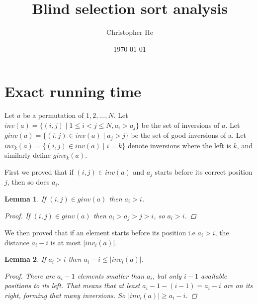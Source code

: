 \documentclass{article}
\title{Blind selection sort analysis}
\author{Christopher He}
\date{\today}
\newtheorem{lemma}{Lemma}
\begin{document}
\maketitle
\section{Exact running time}

Let $a$ be a permutation of $1,2, ..., N$.
Let $inv(a) = \{(i, j) \mid 1 \leq i < j \leq N, a_i > a_j \}$ be the set of inversions of $a$.
Let $ginv(a) = \{(i, j) \in inv(a) \mid a_j > j\}$ be the set of good inversions of a.
Let $inv_k(a) = \{(i, j) \in inv(a) \mid i = k\}$ denote inversions where the left is $k$,
and similarly define $ginv_k(a)$.

First we proved that if $(i, j) \in inv(a)$ and $a_j$ starts before its correct position $j$, then
so does $a_i$.

\begin{lemma}
    If $(i, j) \in ginv(a)$ then $a_i > i$.
    \begin{proof}
        If $(i, j) \in ginv(a)$ then $a_i > a_j > j > i$, so $a_i > i$.
    \end{proof}
\end{lemma}

We then proved that if an element starts before its position i.e $a_i > i$, the distance $a_i - i$ is 
at most $\vert inv_i(a) \vert$.

\begin{lemma} If $a_i > i$ then $a_i - i \leq \vert inv_i(a) \vert$.
    \begin{proof} There are $a_i - 1$ elements smaller than $a_i$, but only $i - 1$ available positions to its left. That means that at least $a_i - 1 - (i - 1) = a_i - i $ are on its right, forming that many inversions. So $ \vert inv_i(a) \vert \geq a_i - i$.
    \end{proof}
\end{lemma}
\end{document}
